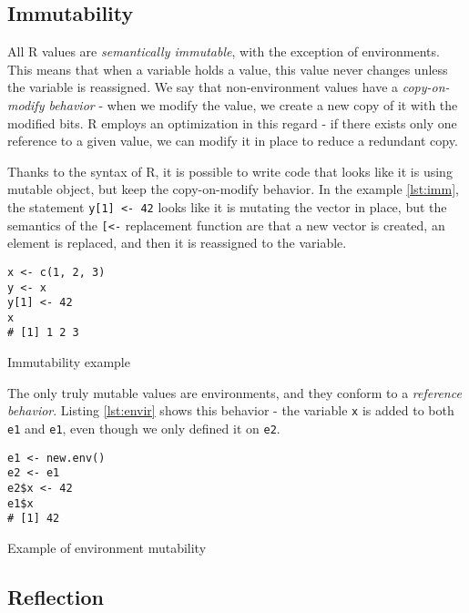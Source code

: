 \subsection*{Immutability}

All R values are \textit{semantically immutable}, with the exception of environments. This means that when a variable holds a value, this value never changes unless the variable is reassigned. We say that non-environment values have a \textit{copy-on-modify behavior} - when we modify the value, we create a new copy of it with the modified bits. R employs an optimization in this regard - if there exists only one reference to a given value, we can modify it in place to reduce a redundant copy.

Thanks to the syntax of R, it is possible to write code that looks like it is using mutable object, but keep the copy-on-modify behavior. In the example \ref{lst:imm}, the statement \texttt{y[1] <- 42} looks like it is mutating the vector in place, but the semantics of the \texttt{[<-} replacement function are that a new vector is created, an element is replaced, and then it is reassigned to the variable.

\begin{listing}[h!]
	\centering
	\begin{verbatim}
x <- c(1, 2, 3)
y <- x
y[1] <- 42
x
# [1] 1 2 3
  \end{verbatim}
  \caption{Immutability example}\label{lst:imm}
\end{listing}

The only truly mutable values are environments, and they conform to a \textit{reference behavior}. Listing \ref{lst:envir} shows this behavior - the variable \texttt{x} is added to both \texttt{e1} and \texttt{e1}, even though we only defined it on \texttt{e2}.

\begin{listing}[h!]
	\centering
	\begin{verbatim}
e1 <- new.env()
e2 <- e1
e2$x <- 42
e1$x
# [1] 42
  \end{verbatim}
	\caption{Example of environment mutability}\label{lst:envir}
\end{listing}


\subsection*{Reflection}


